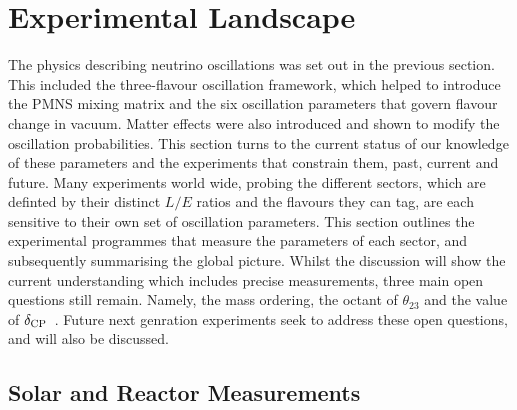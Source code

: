 \section{Experimental Landscape}
\label{sec:landscape}


The physics describing neutrino oscillations was set out in the previous section. This
included the three-flavour oscillation framework, which helped to introduce 
the PMNS mixing matrix and the six oscillation parameters that govern flavour change in vacuum.
Matter effects were also introduced and shown to modify the oscillation probabilities. 
This section turns to the current status of our knowledge of these parameters and the 
experiments that constrain them, past, current and future. Many experiments world wide, probing 
the different sectors, which are definted by their distinct $L/E$ ratios and the flavours they can tag,
are each sensitive to their own set of oscillation parameters. This section outlines the
experimental programmes that measure the parameters of each sector, and subsequently 
summarising the global picture. Whilst the discussion will show the current understanding 
which includes precise measurements, three main open questions still remain. Namely, the mass ordering, 
the octant of $\theta_{23}$ and the value of $\delta_{\rm CP}$~\cite{NuFIT60,NuFIT61}. Future next genration experiments seek to 
address these open questions, and will also be discussed.
 

\subsection{Solar and Reactor Measurements}
\label{sec:landscape-solar-reactor}



